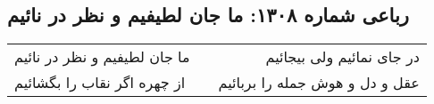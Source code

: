 \begin{center}
\section*{رباعی شماره ۱۳۰۸: ما جان لطیفیم و نظر در نائیم}
\label{sec:1308}
\begin{longtable}{l p{0.5cm} r}
ما جان لطیفیم و نظر در نائیم
&&
در جای نمائیم ولی بیجائیم
\\
از چهره اگر نقاب را بگشائیم
&&
عقل و دل و هوش جمله را بربائیم
\\
\end{longtable}
\end{center}
